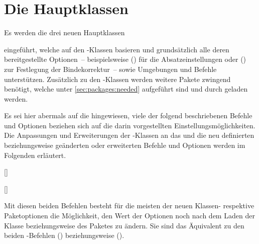 \chapter[%
  Die Hauptklassen \ClassRaw{tudscrbook}{\BooleanFalse},
  \ClassRaw{tudscrreprt}{\BooleanFalse} und
  \ClassRaw{tudscrartcl}{\BooleanFalse}%
]{%
  Die Hauptklassen%
  \label{sec:mainclasses}%
}

\begin{DeclareEntity*}{}
\begin{DeclareEntity*}{}
\begin{DeclareEntity*}{}
%
Es werden die drei neuen Hauptklassen
%
\begin{description}
\item {}
\item {}
\item {}
\end{description}
%
eingeführt, welche auf den \KOMAScript-Klassen basieren und grundsätzlich alle 
deren bereitgestellte Optionen~-- beispielsweise 
() für die Absatzeinstellungen oder 
() zur Festlegung der 
Bindekorrektur~-- sowie Umgebungen und Befehle unterstützen. Zusätzlich zu den 
\KOMAScript-Klassen werden weitere Pakete zwingend benötigt, welche unter 
\autoref{sec:packages:needed} aufgeführt sind und durch \TUDScript geladen 
werden.

Es sei hier abermals auf die  
hingewiesen, viele der folgend beschriebenen Befehle und Optionen beziehen sich 
auf die darin vorgestellten Einstellungsmöglichkeiten. Die Anpassungen und 
Erweiterungen der \KOMAScript-Klassen an das \CD und die neu definierten 
beziehungsweise geänderten oder erweiterten Befehle und Optionen werden im 
Folgenden erläutert.

\begin{Declaration}
  {[]}
\begin{Declaration}
  {[]}
\printdeclarationlist[Optionen|!]

Mit diesen beiden Befehlen besteht für die meisten der neuen Klassen- respektive
Paketoptionen die Möglichkeit, den Wert der Optionen noch nach dem Laden der 
Klasse beziehungsweise des Paketes zu ändern. Sie sind das Äquivalent zu den 
beiden \KOMAScript-Befehlen () 
beziehungsweise ().


\end{Declaration}
\end{Declaration}
\end{DeclareEntity*}
\end{DeclareEntity*}
\end{DeclareEntity*}
